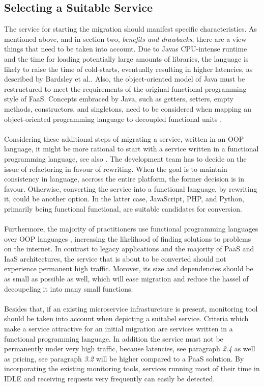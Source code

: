 \documentclass[a4paper,11pt, pagesize]{scrartcl}
\begin{document}
\begin{spacing}{1.2}
\subsection{Selecting a Suitable Service}The service for starting the migration should manifest specific characteristics. As mentioned above, and in section two, \textit{benefits and drawbacks}, there are a view things that need to be taken into account. Due to Javas CPU-intense runtime and the time for loading potentially large amounts of libraries, the language is likely to raise the time of cold-starts, eventually resulting in higher latencies, as described by Bardsley et al.. Also, the object-oriented model of Java must be restructured to meet the requirements of the original functional programming style of FaaS. Concepts embraced by Java, such as getters, setters, empty methods, constructors, and singletons, need to be considered when mapping an object-oriented programming language to decoupled functional units \cite{bardsley2018serverless}.\\\\ Considering these additional steps of migrating a service, written in an OOP language, it might be more rational to start with a service written in a functional programming language, see also \cite{leitner2019mixed}. The development team has to decide on the issue of refactoring in favour of rewriting. When the goal is to maintain consistency in language, accross the entire platform, the former decision is in favour. Otherwise, converting the service into a functional language, by rewriting it, could be another option. In the latter case, JavaScript, PHP, and Python, primarily being functional functional, are suitable candidates for conversion.\\\\ Furthermore, the majority of practitioners use functional programming languages over OOP languages \cite{leitner2019mixed}, increasing the likelihood of finding solutions to problems on the internet. In contrast to legacy applications and the majority of PaaS and IaaS architectures, the service that is about to be converted should not experience permanent high traffic. Morover, its size and dependencies should be as small as possible as well, which will ease migration and reduce the hassel of decoupeling it into many small functions.\\\\Besides that, if an existing microservice infrasturcture is present, monitoring tool should be taken into account when depicting a suitabel service. Criteria which make a service attractive for an initial migration are services written in a functional programming language. In addition the service must not be permanently under very high traffic, because latencies, see paragraph \textit{2.4} as well as pricing, see paragraph \textit{3.2} will be higher compared to a PaaS solution. By incorporating the existing monitoring tools, services running most of their time in IDLE and receiving requests very frequently can easily be detected.

\end{spacing}
\end{document}
